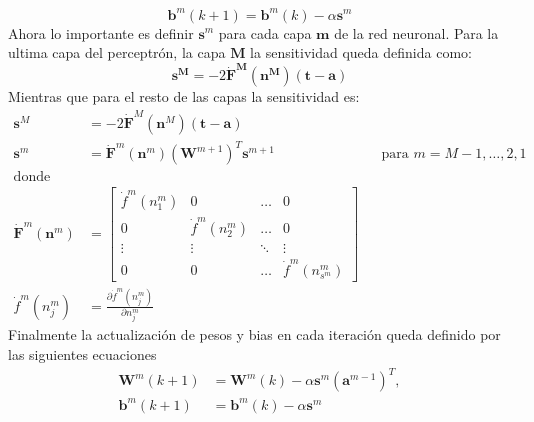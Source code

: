 \begin{equation} \label{eq:9}
\boldsymbol{b}^{m}(k+1) = \boldsymbol{b}^{m}(k) - \alpha \boldsymbol{s}^{m}
\end{equation}
Ahora lo importante es definir $\boldsymbol{s}^{m}$ para cada capa $\boldsymbol{m}$ de la red neuronal. Para la ultima capa del perceptrón, la capa $\boldsymbol{M}$ la sensitividad queda definida como:
\begin{equation} \label{eq:10}
    \boldsymbol{s^M} = 
    -2\boldsymbol{\dot{F}^{M}}(\boldsymbol{n^{M}})(\boldsymbol{t-a})
\end{equation}
Mientras que para el resto de las capas la sensitividad es:
\begin{align*}
\boldsymbol{s}^M &= 
-2\boldsymbol{\dot{F}}^{M}(\boldsymbol{n}^{M})(\boldsymbol{t-a}) \\
\boldsymbol{s}^{m} &= 
\boldsymbol{\dot{F}}^{m}(\boldsymbol{n}^{m})(\boldsymbol{W}^{m+1})^{T}
\boldsymbol{s}^{m+1} & & \text{para $m=M-1, \ldots, 2, 1$} \\
\text{donde} \\
\boldsymbol{\dot{F}}^{m}(\boldsymbol{n}^{m}) &=
\begin{bmatrix}
\dot{f}^{m}(n_{1}^{m}) & 0 & \ldots & 0 \\
0 & \dot{f}^{m}(n_{2}^{m}) & \ldots & 0 \\
\vdots & \vdots & \ddots & \vdots \\
0 & 0 & \ldots & \dot{f}^{m}(n_{s^{m}}^{m})
\end{bmatrix} \\
\dot{f}^{m}(n_{j}^{m}) &= 
\frac{\partial \dot{f}^{m}(n_{j}^{m})}{\partial n_{j}^{m}}
\end{align*}
Finalmente la actualización de pesos y bias en cada iteración queda definido por las siguientes ecuaciones
\begin{align*}
\boldsymbol{W}^{m}(k+1) &= \boldsymbol{W}^{m}(k)-\alpha 
\boldsymbol{s}^{m}(\boldsymbol{a}^{m-1})^{T}, \\
\boldsymbol{b}^{m}(k+1) &= \boldsymbol{b}^{m}(k) - \alpha \boldsymbol{s}^{m}
\end{align*}